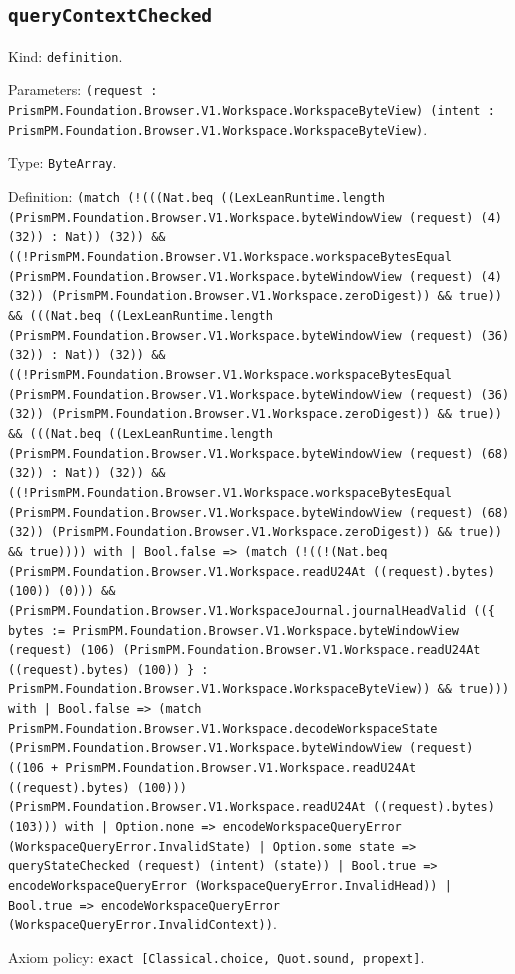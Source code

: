 \documentclass[11pt]{article}
\begin{document}
\subsection*{\texttt{queryContextChecked}}
\noindent Kind: \texttt{definition}.\par
\noindent Parameters: \texttt{(request : PrismPM.Foundation.Browser.V1.Workspace.WorkspaceByteView) (intent : PrismPM.Foundation.Browser.V1.Workspace.WorkspaceByteView)}.\par
\noindent Type: \texttt{ByteArray}.\par
\noindent Definition: \texttt{(match (!(((Nat.beq ((LexLeanRuntime.length (PrismPM.Foundation.Browser.V1.Workspace.byteWindowView (request) (4) (32)) : Nat)) (32)) \&\& ((!PrismPM.Foundation.Browser.V1.Workspace.workspaceBytesEqual (PrismPM.Foundation.Browser.V1.Workspace.byteWindowView (request) (4) (32)) (PrismPM.Foundation.Browser.V1.Workspace.zeroDigest)) \&\& true)) \&\& (((Nat.beq ((LexLeanRuntime.length (PrismPM.Foundation.Browser.V1.Workspace.byteWindowView (request) (36) (32)) : Nat)) (32)) \&\& ((!PrismPM.Foundation.Browser.V1.Workspace.workspaceBytesEqual (PrismPM.Foundation.Browser.V1.Workspace.byteWindowView (request) (36) (32)) (PrismPM.Foundation.Browser.V1.Workspace.zeroDigest)) \&\& true)) \&\& (((Nat.beq ((LexLeanRuntime.length (PrismPM.Foundation.Browser.V1.Workspace.byteWindowView (request) (68) (32)) : Nat)) (32)) \&\& ((!PrismPM.Foundation.Browser.V1.Workspace.workspaceBytesEqual (PrismPM.Foundation.Browser.V1.Workspace.byteWindowView (request) (68) (32)) (PrismPM.Foundation.Browser.V1.Workspace.zeroDigest)) \&\& true)) \&\& true)))) with | Bool.false => (match (!((!(Nat.beq (PrismPM.Foundation.Browser.V1.Workspace.readU24At ((request).bytes) (100)) (0))) \&\& (PrismPM.Foundation.Browser.V1.WorkspaceJournal.journalHeadValid ((\{ bytes := PrismPM.Foundation.Browser.V1.Workspace.byteWindowView (request) (106) (PrismPM.Foundation.Browser.V1.Workspace.readU24At ((request).bytes) (100)) \} : PrismPM.Foundation.Browser.V1.Workspace.WorkspaceByteView)) \&\& true))) with | Bool.false => (match PrismPM.Foundation.Browser.V1.Workspace.decodeWorkspaceState (PrismPM.Foundation.Browser.V1.Workspace.byteWindowView (request) ((106 + PrismPM.Foundation.Browser.V1.Workspace.readU24At ((request).bytes) (100))) (PrismPM.Foundation.Browser.V1.Workspace.readU24At ((request).bytes) (103))) with | Option.none => encodeWorkspaceQueryError (WorkspaceQueryError.InvalidState) | Option.some state => queryStateChecked (request) (intent) (state)) | Bool.true => encodeWorkspaceQueryError (WorkspaceQueryError.InvalidHead)) | Bool.true => encodeWorkspaceQueryError (WorkspaceQueryError.InvalidContext))}.\par
\noindent Axiom policy: \texttt{exact [Classical.choice, Quot.sound, propext]}.\par
\end{document}
